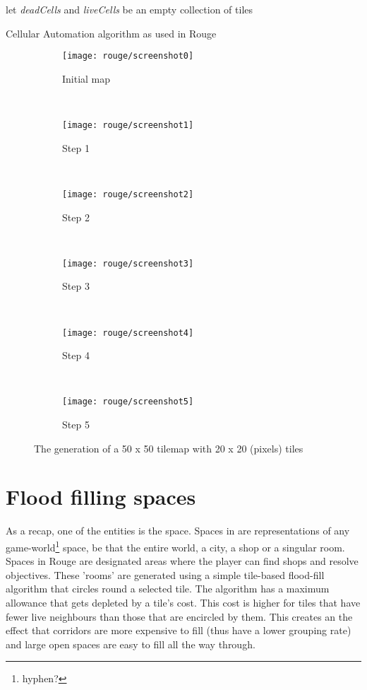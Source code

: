 \begin{algorithm}
	let \textit{deadCells} and \textit{liveCells} be an empty collection of tiles\;
	\caption{Cellular Automation algorithm as used in Rouge}\label{alg:ca}
\end{algorithm}

\begin{figure}[p]
	\centering
	\begin{subfigure}[b]{0.3\textwidth}
		\texttt{[image: rouge/screenshot0]}
		\caption{Initial map}
	\end{subfigure}	
	~
	\begin{subfigure}[b]{0.3\textwidth}
		\texttt{[image: rouge/screenshot1]}
		\caption{Step 1}
	\end{subfigure}	
	~
	\begin{subfigure}[b]{0.3\textwidth}
		\texttt{[image: rouge/screenshot2]}
		\caption{Step 2}
	\end{subfigure}	
	~
	\begin{subfigure}[b]{0.3\textwidth}
		\texttt{[image: rouge/screenshot3]}
		\caption{Step 3}
	\end{subfigure}		
	~
	\begin{subfigure}[b]{0.3\textwidth}
		\texttt{[image: rouge/screenshot4]}
		\caption{Step 4}
	\end{subfigure}
	~
	\begin{subfigure}[b]{0.3\textwidth}
		\texttt{[image: rouge/screenshot5]}
		\caption{Step 5}
	\end{subfigure}	
	\caption{The generation of a 50 x 50 tilemap with 20 x 20 (pixels) tiles}\label{fig:rouge:screens}
\end{figure}

\section{Flood filling spaces}
As a recap, one of the \diage entities is the space. Spaces in \diage are representations of any game-world\footnote{hyphen?} space, be that the entire world, a city, a shop or a singular room. Spaces in Rouge are designated areas where the player can find shops and resolve \his objectives. These 'rooms' are generated using a simple tile-based flood-fill algorithm that circles round a selected tile. The algorithm has a maximum allowance that gets depleted by a tile's cost. This cost is higher for tiles that have fewer live neighbours than those that are encircled by them. This creates an the effect that corridors are more expensive to fill (thus have a lower grouping rate) and large open spaces are easy to fill all the way through.